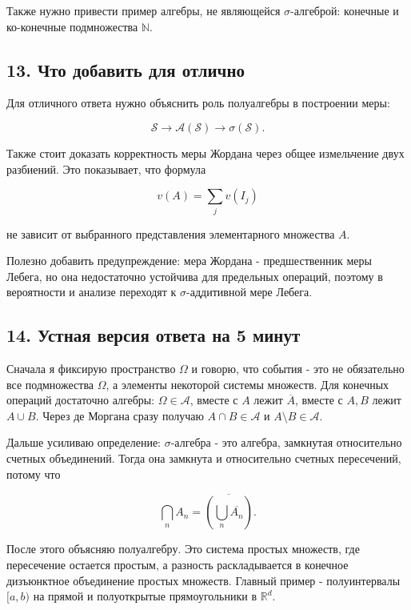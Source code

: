 \documentclass[
  11pt,
  a4paper,
]{article}
\begin{document}
Также нужно привести пример алгебры, не являющейся \(\sigma\)-алгеброй:
конечные и ко-конечные подмножества \(\mathbb N\).

\subsection{13. Что добавить для
отлично}\label{ux447ux442ux43e-ux434ux43eux431ux430ux432ux438ux442ux44c-ux434ux43bux44f-ux43eux442ux43bux438ux447ux43dux43e}

Для отличного ответа нужно объяснить роль полуалгебры в построении меры:

\[
\mathcal S\longrightarrow \mathcal A(\mathcal S)\longrightarrow \sigma(\mathcal S).
\]

Также стоит доказать корректность меры Жордана через общее измельчение
двух разбиений. Это показывает, что формула

\[
v(A)=\sum_j v(I_j)
\]

не зависит от выбранного представления элементарного множества \(A\).

Полезно добавить предупреждение: мера Жордана - предшественник меры
Лебега, но она недостаточно устойчива для предельных операций, поэтому в
вероятности и анализе переходят к \(\sigma\)-аддитивной мере Лебега.

\subsection{14. Устная версия ответа на 5
минут}\label{ux443ux441ux442ux43dux430ux44f-ux432ux435ux440ux441ux438ux44f-ux43eux442ux432ux435ux442ux430-ux43dux430-5-ux43cux438ux43dux443ux442}

Сначала я фиксирую пространство \(\Omega\) и говорю, что события - это
не обязательно все подмножества \(\Omega\), а элементы некоторой системы
множеств. Для конечных операций достаточно алгебры:
\(\Omega\in\mathcal A\), вместе с \(A\) лежит \(\overline{A}\), вместе с
\(A,B\) лежит \(A\cup B\). Через де Моргана сразу получаю
\(A\cap B\in\mathcal A\) и \(A\setminus B\in\mathcal A\).

Дальше усиливаю определение: \(\sigma\)-алгебра - это алгебра, замкнутая
относительно счетных объединений. Тогда она замкнута и относительно
счетных пересечений, потому что

\[
\bigcap_n A_n=\overline{\left(\bigcup_n \overline{A_n}\right)}.
\]

После этого объясняю полуалгебру. Это система простых множеств, где
пересечение остается простым, а разность раскладывается в конечное
дизъюнктное объединение простых множеств. Главный пример - полуинтервалы
\([a,b)\) на прямой и полуоткрытые прямоугольники в \(\mathbb R^d\).
\end{document}
